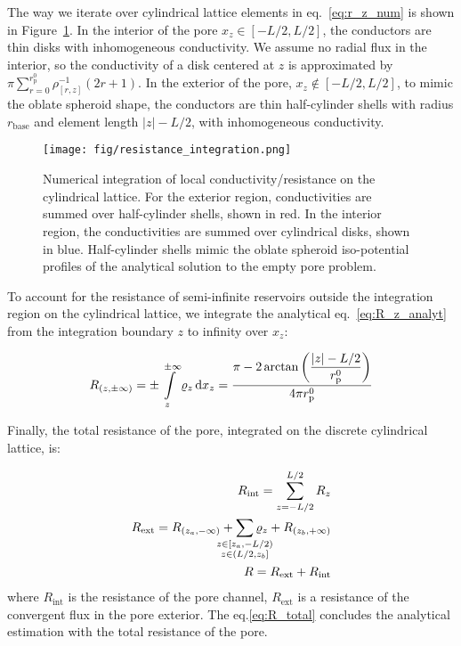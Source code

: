 \documentclass[10pt, a4paper]{article}
\begin{document}
\begin{multicols}{2}
The way we iterate over cylindrical lattice elements in eq.~\ref{eq:r_z_num} is shown in Figure~\ref{fig:integration_scheme}.
In the interior of the pore $x_z \in [-L/2, L/2]$, the conductors are thin disks with inhomogeneous conductivity.
We assume no radial flux in the interior, so the conductivity of a disk centered at $z$ is approximated by $\pi \sum_{r=0}^{r_{\text{p}}^{0}} \rho^{-1}_{[r,z]} (2r + 1)$.
In the exterior of the pore, $x_z \notin [-L/2, L/2]$, to mimic the oblate spheroid shape, the conductors are thin half-cylinder shells with radius $r_{\text{base}}$ and element length $|z| - L/2$, with inhomogeneous conductivity.
\begin{figure}[H]
    \centering
    \texttt{[image: fig/resistance\_integration.png]}
    \caption{
        Numerical integration of local conductivity/resistance on the cylindrical lattice.
        For the exterior region, conductivities are summed over half-cylinder shells, shown in red.
        In the interior region, the conductivities are summed over cylindrical disks, shown in blue.
        Half-cylinder shells mimic the oblate spheroid iso-potential profiles of the analytical solution to the empty pore problem.
        }
    \label{fig:integration_scheme}
\end{figure}

To account for the resistance of semi-infinite reservoirs outside the integration region on the cylindrical lattice, we integrate the analytical eq.~\ref{eq:R_z_analyt} from the integration boundary $z$ to infinity over $x_z$:

\begin{eqnarray}
    \label{eq:r_reservoir}
    R_{(z, \pm\infty)} = \pm \int\displaylimits_{z}^{\pm\infty} \varrho_{z} \, \text{d}x_z = \dfrac{\pi - 2 \arctan\left( \dfrac{|z| - L/2}{r_{\text{p}}^{0}} \right)}{4 \pi r_{\text{p}}^{0}}
\end{eqnarray}

Finally, the total resistance of the pore, integrated on the discrete cylindrical lattice, is:

\begin{eqnarray}
    R_{\text{int}} = \sum_{z=-L/2}^{L/2} R_z
    \\
    R_{\text{ext}} = R_{(z_{a}, -\infty)} + \sum\limits_{\mathclap{\substack{z \in [z_{a},-L/2)\\z \in (L/2, z_b]}}} \varrho_{z} + R_{(z_{b}, +\infty)}
    \\
    \label{eq:R_total}
    R = R_{\text{ext}} + R_{\text{int}}
\end{eqnarray}
where $R_{\text{int}}$ is the resistance of the pore channel, $R_{\text{ext}}$ is a resistance of the convergent flux in the pore exterior.
The eq.\ref{eq:R_total} concludes the analytical estimation with the total resistance of the pore.


\end{multicols}
\end{document}
